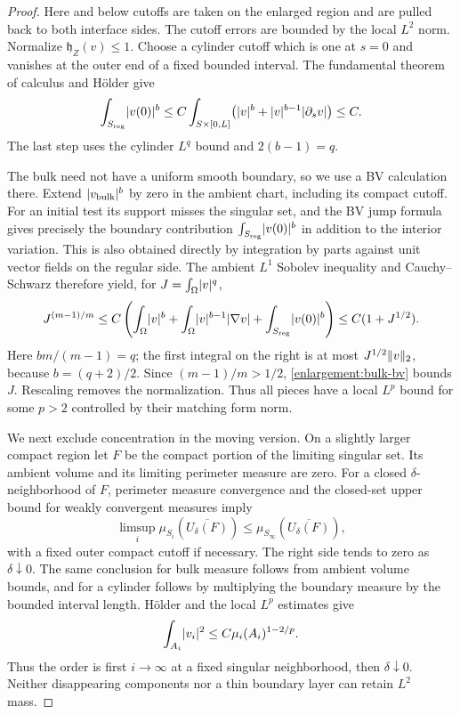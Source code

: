 \begin{proof}
Here and below cutoffs are taken on the enlarged region and are pulled
back to both interface sides.  The cutoff errors are bounded by the local
$L^2$ norm.  Normalize $\mathfrak h_Z(v)\le1$.  Choose a cylinder cutoff
which is one at $s=0$ and vanishes at the outer end of a fixed bounded
interval.  The fundamental theorem of calculus and H\"older give
\begin{equation}\label{enlargement:trace}
 \int_{S_{\rm reg}}\lvert v(0)\rvert^b
 \le C\int_{S\times[0,L]}
       \bigl(\lvert v\rvert^b+\lvert v\rvert^{b-1}\lvert\partial_s v\rvert\bigr)
 \le C.
\end{equation}
The last step uses the cylinder $L^q$ bound and $2(b-1)=q$.

The bulk need not have a uniform smooth boundary, so we use a BV
calculation there.  Extend $\lvert v_{\rm bulk}\rvert^b$ by zero in the ambient
chart, including its compact cutoff.  For an initial test its support
misses the singular set, and the BV jump formula gives precisely the
boundary contribution $\int_{S_{\rm reg}}\lvert v(0)\rvert^b$ in addition to the
interior variation.  This is also obtained directly by integration by
parts against unit vector fields on the regular side.  The ambient
$L^1$ Sobolev inequality and Cauchy--Schwarz therefore yield, for
$J=\int_\Omega\lvert v\rvert^q$,
\begin{equation}\label{enlargement:bulk-bv}
 J^{(m-1)/m}
 \le C\left(
       \int_\Omega\lvert v\rvert^b+
       \int_\Omega\lvert v\rvert^{b-1}\lvert\nabla v\rvert
       +\int_{S_{\rm reg}}\lvert v(0)\rvert^b\right)
 \le C(1+J^{1/2}).
\end{equation}
Here $bm/(m-1)=q$; the first integral on the right is at most
$J^{1/2}\lVert v\rVert_2$, because $b=(q+2)/2$.  Since $(m-1)/m>1/2$, \cref{enlargement:bulk-bv} bounds $J$.
Rescaling removes the normalization.  Thus all pieces have a local
$L^p$ bound for some $p>2$ controlled by their matching form norm.

We next exclude concentration in the moving version.  On a slightly
larger compact region let $F$ be the compact portion of the limiting
singular set.  Its ambient volume and its limiting perimeter measure
are zero.  For a closed $\delta$-neighborhood of $F$, perimeter measure
convergence and the closed-set upper bound for weakly convergent
measures imply
\[
 \limsup_i\mu_{S_i}(\overline{U_\delta(F)})
       \le \mu_{S_\infty}(\overline{U_\delta(F)}),
\]
with a fixed outer compact cutoff if necessary.  The right side tends
to zero as $\delta\downarrow0$.  The same conclusion for bulk measure
follows from ambient volume bounds, and for a cylinder follows by
multiplying the boundary measure by the bounded interval length.  H\"older
and the local $L^p$ estimates give
\[
 \int_{A_i}\lvert v_i\rvert^2
 \le C\mu_i(A_i)^{1-2/p}.
\]
Thus the order is first $i\to\infty$ at a fixed singular neighborhood,
then $\delta\downarrow0$.  Neither disappearing components nor a thin
boundary layer can retain $L^2$ mass.


\end{proof}
